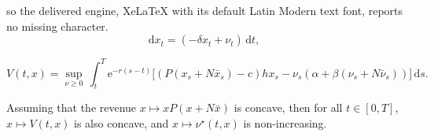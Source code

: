\documentclass[10pt,a4paper]{amsart}
\def\drm{\mathrm{d}}
\def\erm{\mathrm{e}}
\begin{document}
so the delivered engine, XeLaTeX with its default Latin Modern text font, reports no missing character.
\begin{equation}\label{eq:dynamic_x_heterogeneous}
    \drm x^{}_t=(-\delta x^{}_t+\nu^{}_t)\,  \drm t,
\end{equation}

\begin{equation}\label{value}
V(t,x)=\sup_{\nu\geq0}\,\int_{t}^{T} \erm^{-r(s-t)}\Big[(P(x_s + N\bar{x}_s)-c)hx_s-\nu_s(\alpha+\beta(\nu_s+N\bar{\nu}_s))\Big]\, \drm s.
\end{equation}

\begin{lemma}\label{V_concave}
Assuming that the revenue $x \longmapsto x P(x+N\bar{x})$ is concave, then for all $t \in [0,T]$, $x \longmapsto V(t,x)$ is also concave, and $x \longmapsto \nu^\star(t,x)$ is non-increasing.
\end{lemma}
\end{document}
